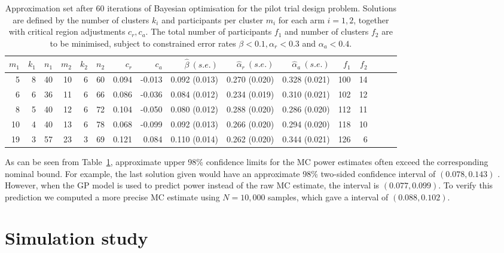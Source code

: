\documentclass{article} %
\begin{document}
\begin{table}
\centering
\begin{tabular}{rrrrrrrrrrrrrrrr}
\toprule 
$m_{1}$ & $k_{1}$ & $n_{1}$ & $m_{2}$ & $k_{2}$ & $n_{2}$ & $c_{r}$ & $c_{a}$ & $\hat{\beta}~(s.e.)$ & $\hat{\alpha}_{r}~(s.e.)$ & $\hat{\alpha}_{a}~(s.e.)$ & $f_{1}$ & $f_{2}$ \\
\midrule
5 & 8 & 40 & 10 & 6 & 60 & 0.094 & -0.013 & 0.092 (0.013) & 0.270 (0.020) & 0.328 (0.021) & 100 & 14 \\ 
6 & 6 & 36 & 11 & 6 & 66 & 0.086 & -0.036 & 0.084 (0.012) & 0.234 (0.019) & 0.310 (0.021) & 102 & 12 \\ 
8 & 5 & 40 & 12 & 6 & 72 & 0.104 & -0.050 & 0.080 (0.012) & 0.288 (0.020) & 0.286 (0.020) & 112 & 11 \\ 
10 & 4 & 40 & 13 & 6 & 78 & 0.068 & -0.099 & 0.092 (0.013) & 0.266 (0.020) & 0.294 (0.020) & 118 & 10 \\ 
19 & 3 & 57 & 23 & 3 & 69 & 0.121 & 0.084 & 0.110 (0.014) & 0.262 (0.020) & 0.344 (0.021) & 126 & 6 \\ 
\bottomrule
\end{tabular}
\caption{Approximation set after 60 iterations of Bayesian optimisation for the pilot trial design problem.
Solutions are defined by the number of clusters $k_{i}$ and participants per cluster $m_{i}$ for each arm $i=1,2$, together with critical region adjustments $c_{r}, c_{a}$. The total number of participants $f_{1}$ and number of clusters $f_{2}$ are to be minimised, subject to constrained error rates $\beta < 0.1, \alpha_{r} < 0.3$ and $\alpha_{a} < 0.4$.}
\label{tab:pilot_single_run}
\end{table}


As can be seen from Table~\ref{tab:pilot_single_run}, approximate upper 98\% confidence limits for the MC power estimates often exceed the corresponding nominal bound. For example, the last solution given would have an approximate 98\% two-sided confidence interval of $(0.078, 0.143)$ . However, when the GP model is used to predict power instead of the raw MC estimate, the interval is $(0.077, 0.099)$.  To verify this prediction we computed a more precise MC estimate using $N = 10,000$ samples, which gave a interval of $(0.088, 0.102)$.

\section{Simulation study}\label{sec:simulation}
\end{document}

